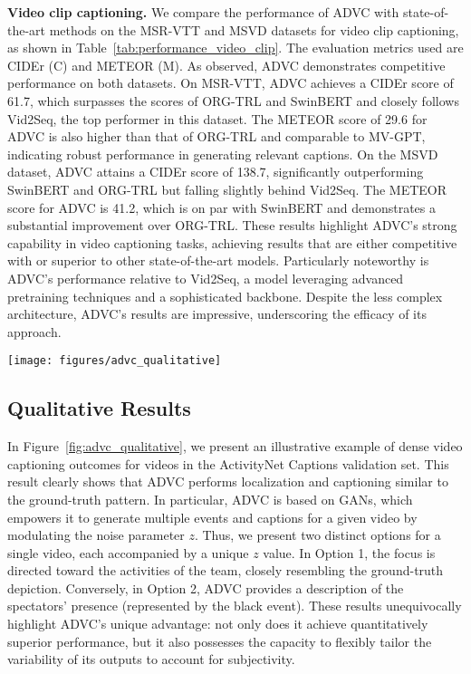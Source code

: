 \textbf{Video clip captioning.}
We compare the performance of ADVC with state-of-the-art methods on the MSR-VTT and MSVD datasets for video clip captioning, as shown in Table~\ref{tab:performance_video_clip}.
The evaluation metrics used are CIDEr (C) and METEOR (M).
As observed, ADVC demonstrates competitive performance on both datasets.
On MSR-VTT, ADVC achieves a CIDEr score of 61.7, which surpasses the scores of ORG-TRL and SwinBERT and closely follows Vid2Seq, the top performer in this dataset.
The METEOR score of 29.6 for ADVC is also higher than that of ORG-TRL and comparable to MV-GPT, indicating robust performance in generating relevant captions.
On the MSVD dataset, ADVC attains a CIDEr score of 138.7, significantly outperforming SwinBERT and ORG-TRL but falling slightly behind Vid2Seq.
The METEOR score for ADVC is 41.2, which is on par with SwinBERT and demonstrates a substantial improvement over ORG-TRL.
These results highlight ADVC's strong capability in video captioning tasks, achieving results that are either competitive with or superior to other state-of-the-art models.
Particularly noteworthy is ADVC's performance relative to Vid2Seq, a model leveraging advanced pretraining techniques and a sophisticated backbone.
Despite the less complex architecture, ADVC's results are impressive, underscoring the efficacy of its approach.

\begin{sidewaysfigure}
    \centering
    \texttt{[image: figures/advc\_qualitative]}
    \caption{Example of ADVC's dense video captioning on the ActivityNet Captions validation set.}
    \label{fig:advc_qualitative}
\end{sidewaysfigure}


\subsection{Qualitative Results}
In Figure~\ref{fig:advc_qualitative}, we present an illustrative example of dense video captioning outcomes for videos in the ActivityNet Captions validation set.
This result clearly shows that ADVC performs localization and captioning similar to the ground-truth pattern.
In particular, ADVC is based on GANs, which empowers it to generate multiple events and captions for a given video by modulating the noise parameter $z$.
Thus, we present two distinct options for a single video, each accompanied by a unique $z$ value.
In Option 1, the focus is directed toward the activities of the team, closely resembling the ground-truth depiction. 
Conversely, in Option 2, ADVC provides a description of the spectators' presence (represented by the black event).
These results unequivocally highlight ADVC's unique advantage: not only does it achieve quantitatively superior performance, but it also possesses the capacity to flexibly tailor the variability of its outputs to account for subjectivity.

